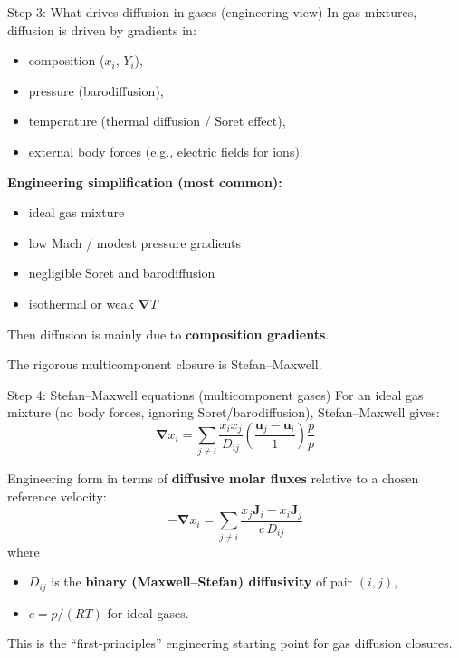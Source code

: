 \documentclass[aspectratio=169]{beamer}
\newcommand{\grad}{\bm{\nabla}}
\newcommand{\J}{\bm{J}}
\newcommand{\uvec}{\bm{u}}
\begin{document}
\begin{frame}{Step 3: What drives diffusion in gases (engineering view)}
In gas mixtures, diffusion is driven by gradients in:
\begin{itemize}
  \item composition ($x_i$, $Y_i$),
  \item pressure (barodiffusion),
  \item temperature (thermal diffusion / Soret effect),
  \item external body forces (e.g., electric fields for ions).
\end{itemize}

\vspace{0.2cm}
\textbf{Engineering simplification (most common):}
\begin{itemize}
  \item ideal gas mixture
  \item low Mach / modest pressure gradients
  \item negligible Soret and barodiffusion
  \item isothermal or weak $\grad T$
\end{itemize}
Then diffusion is mainly due to \textbf{composition gradients}.

\vspace{0.25cm}
The rigorous multicomponent closure is Stefan--Maxwell.
\end{frame}

\begin{frame}{Step 4: Stefan--Maxwell equations (multicomponent gases)}
For an ideal gas mixture (no body forces, ignoring Soret/barodiffusion), Stefan--Maxwell gives:
\[
\boxed{
\grad x_i = \sum_{j\neq i}\frac{x_i x_j}{D_{ij}}\left(\frac{\uvec_j-\uvec_i}{1}\right)\frac{p}{p}
}
\]

Engineering form in terms of \textbf{diffusive molar fluxes} relative to a chosen reference velocity:
\[
\boxed{
-\grad x_i = \sum_{j\neq i}\frac{x_j \J_i - x_i \J_j}{c\,D_{ij}}
}
\]
where
\begin{itemize}
  \item $D_{ij}$ is the \textbf{binary (Maxwell--Stefan) diffusivity} of pair $(i,j)$,
  \item $c=p/(RT)$ for ideal gases.
\end{itemize}

This is the ``first-principles'' engineering starting point for gas diffusion closures.
\end{frame}
\end{document}
